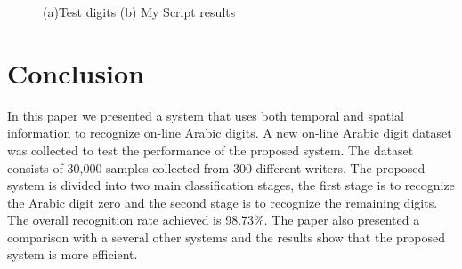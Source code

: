 \documentclass[times, 10pt,twocolumn]{article}
\begin{document}
\begin{figure}[h]
\centering


 \caption{(a)Test digits (b) My Script results}
\end{figure}


\begin{table}[h]
\begin{center}
\caption[Results]{Comparison between the results of the proposed system and those of My Script for the input test digits.}
\label{tab:ResultsMyScript}
\end{center}
\end{table}


\section{Conclusion}
\label{sec:Conclusion}

  In this paper we presented a system that uses both temporal and spatial information to recognize on-line Arabic digits. A new on-line Arabic digit dataset was collected to test the performance of the proposed system. The dataset consists of 30,000 samples collected from 300 different writers. The proposed system is divided into two main classification stages, the first stage is to recognize the Arabic digit zero and the second stage is to recognize the remaining digits. The overall recognition rate achieved is 98.73\%. The paper also presented a comparison with a several other systems and the results show that the proposed system is more efficient.


%

\end{document}
